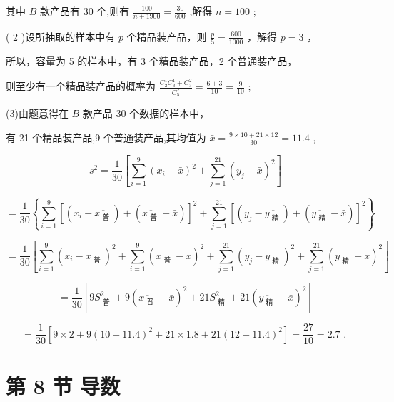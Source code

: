 \documentclass[10pt]{article}
\begin{document}
其中 \(B\) 款产品有 30 个,则有 \(\frac{100}{n + {1900}} = \frac{30}{600}\) ,解得 \(n = {100}\) ;

( 2 )设所抽取的样本中有 \(p\) 个精品装产品，则 \(\frac{p}{5} = \frac{600}{1000}\) ，解得 \(p = 3\) ，

所以，容量为 5 的样本中，有 3 个精品装产品，2 个普通装产品，

则至少有一个精品装产品的概率为 \(\frac{{C}_{2}^{1}{C}_{3}^{1} + {C}_{3}^{2}}{{C}_{5}^{2}} = \frac{6 + 3}{10} = \frac{9}{10}\) ;

(3)由题意得在 \(B\) 款产品 30 个数据的样本中，

有 21 个精品装产品,9 个普通装产品,其均值为 \(\bar{x} = \frac{9 \times  {10} + {21} \times  {12}}{30} = {11.4}\) ,

\[
{s}^{2} = \frac{1}{30}\left\lbrack  {\mathop{\sum }\limits_{{i = 1}}^{9}{\left( {x}_{i} - \bar{x}\right) }^{2} + \mathop{\sum }\limits_{{j = 1}}^{{21}}{\left( {y}_{j} - \bar{x}\right) }^{2}}\right\rbrack
\]

\[
= \frac{1}{30}\left\{  {\mathop{\sum }\limits_{{i = 1}}^{9}{\left\lbrack  \left( {x}_{i} - \overline{{x}_{\text{ 普 }}}\right)  + \left( \overline{{x}_{\text{ 普 }}} - \bar{x}\right) \right\rbrack  }^{2} + \mathop{\sum }\limits_{{j = 1}}^{{21}}{\left\lbrack  \left( {y}_{j} - \overline{{y}_{\text{ 精 }}}\right)  + \left( \overline{{y}_{\text{ 精 }}} - \bar{x}\right) \right\rbrack  }^{2}}\right\}
\]

\[
= \frac{1}{30}\left\lbrack  {\mathop{\sum }\limits_{{i = 1}}^{9}{\left( {x}_{i} - \overline{{x}_{\text{ 普 }}}\right) }^{2} + \mathop{\sum }\limits_{{i = 1}}^{9}{\left( \overline{{x}_{\text{ 普 }}} - \bar{x}\right) }^{2} + \mathop{\sum }\limits_{{j = 1}}^{{21}}{\left( {y}_{j} - \overline{{y}_{\text{ 精 }}}\right) }^{2} + \mathop{\sum }\limits_{{j = 1}}^{{21}}{\left( \overline{{y}_{\text{ 精 }}} - \bar{x}\right) }^{2}}\right\rbrack
\]

\[
= \frac{1}{30}\left\lbrack  {9{S}_{\text{ 普 }}^{2} + 9{\left( \overline{{x}_{\text{ 普 }}} - \bar{x}\right) }^{2} + {21}{S}_{\text{ 精 }}^{2} + {21}{\left( \overline{{y}_{\text{ 精 }}} - \bar{x}\right) }^{2}}\right\rbrack
\]

\[
= \frac{1}{30}\left\lbrack  {9 \times  2 + 9{\left( {10} - {11.4}\right) }^{2} + {21} \times  {1.8} + {21}{\left( {12} - {11.4}\right) }^{2}}\right\rbrack   = \frac{27}{10} = {2.7}\text{ . }
\]

\section*{第 8 节 导数}
\end{document}
